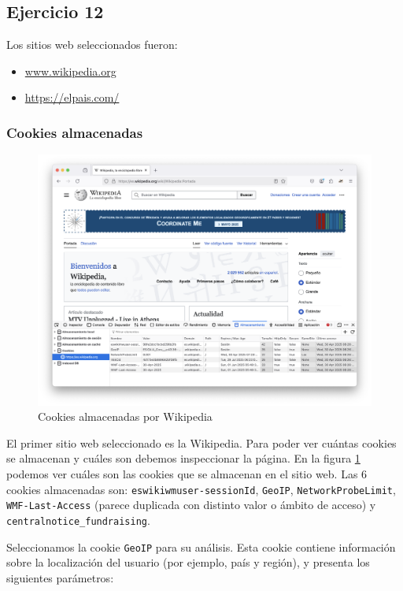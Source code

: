 \subsection{Ejercicio 12}
\graphicspath{ {img/12} }

Los sitios web seleccionados fueron:
\begin{itemize}
    \item \url{www.wikipedia.org}
    \item \url{https://elpais.com/}
\end{itemize}

\subsubsection{Cookies almacenadas}

\begin{figure}[H]
    \centering
    \includegraphics[width=\textwidth]{cookies_wiki.png}
    \caption{Cookies almacenadas por Wikipedia}
    \label{fig:cookies_wiki}
\end{figure}

El primer sitio web seleccionado es la Wikipedia. Para poder ver cuántas cookies se almacenan y cuáles son debemos inspeccionar la página. En la figura \ref{fig:cookies_wiki} podemos ver cuáles son las cookies que se almacenan en el sitio web. Las 6 cookies almacenadas son: \texttt{eswikiwmuser-sessionId}, \texttt{GeoIP}, \texttt{NetworkProbeLimit}, \texttt{WMF-Last-Access} (parece duplicada con distinto valor o ámbito de acceso) y \texttt{centralnotice\_fundraising}.

Seleccionamos la cookie \texttt{GeoIP} para su análisis. Esta cookie contiene información sobre la localización del usuario (por ejemplo, país y región), y presenta los siguientes parámetros: 

